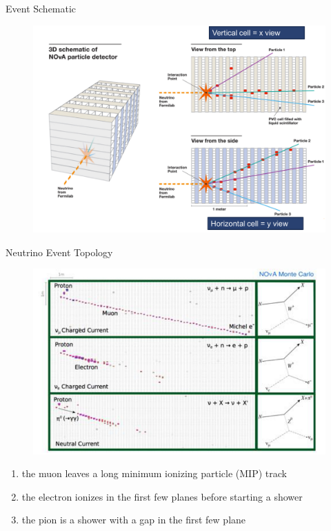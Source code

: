 \documentclass{beamer}
\begin{document}
\begin{frame}{Event Schematic}
\begin{figure}
  \centering
  \includegraphics[width=\textwidth]{figures/schematic.png}
\end{figure}
\end{frame}

\begin{frame}{Neutrino Event Topology}
\begin{figure}
  \centering
  \includegraphics[width=\textwidth]{figures/topology.png}
\end{figure}
\begin{enumerate}
  \scriptsize
  \item the muon leaves a long minimum ionizing particle (MIP) track
  \item the electron ionizes in the first few planes before starting a shower
  \item the pion is a shower with a gap in the first few plane
\end{enumerate}
\end{frame}
\end{document}
